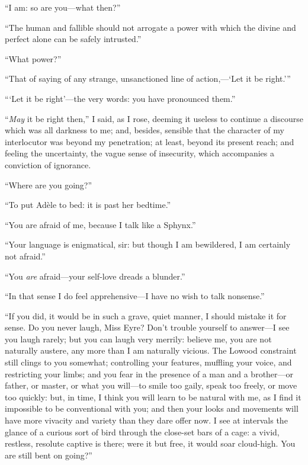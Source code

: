 \enquote{I am: so are you---what then?}

\enquote{The human and fallible should not arrogate a power with which
the divine and perfect alone can be safely intrusted.}

\enquote{What power?}

\enquote{That of saying of any strange, unsanctioned line of
action,---\enquote{Let it be right.}}

\enquote{\enquote{Let it be right}---the very words: you have
pronounced them.}

\enquote{\emph{May} it be right then,} I said, as I rose, deeming it useless
to continue a discourse which was all darkness to me; and, besides,
sensible that the character of my interlocutor was beyond my
penetration; at least, beyond its present reach; and feeling the
uncertainty, the vague sense of insecurity, which accompanies a
conviction of ignorance.

\enquote{Where are you going?}

\enquote{To put Adèle to bed: it is past her bedtime.}

\enquote{You are afraid of me, because I talk like a Sphynx.}

\enquote{Your language is enigmatical, sir: but though I am bewildered,
I am certainly not afraid.}

\enquote{You \emph{are} afraid---your self-love dreads a blunder.}

\enquote{In that sense I do feel apprehensive---I have no wish to talk
nonsense.}

\enquote{If you did, it would be in such a grave, quiet manner, I should
mistake it for sense. Do you never laugh, Miss Eyre? Don't trouble
yourself to answer---I see you laugh rarely; but you can laugh very
merrily: believe me, you are not naturally austere, any more than I am
naturally vicious. The Lowood constraint still clings to you somewhat;
controlling your features, muffling your voice, and restricting your
limbs; and you fear in the presence of a man and a brother---or father,
or master, or what you will---to smile too gaily, speak too freely, or
move too quickly: but, in time, I think you will learn to be natural
with me, as I find it impossible to be conventional with you; and then
your looks and movements will have more vivacity and variety than they
dare offer now. I see at intervals the glance of a curious sort of bird
through the close-set bars of a cage: a vivid, restless, resolute
captive is there; were it but free, it would soar cloud-high. You are
still bent on going?}

